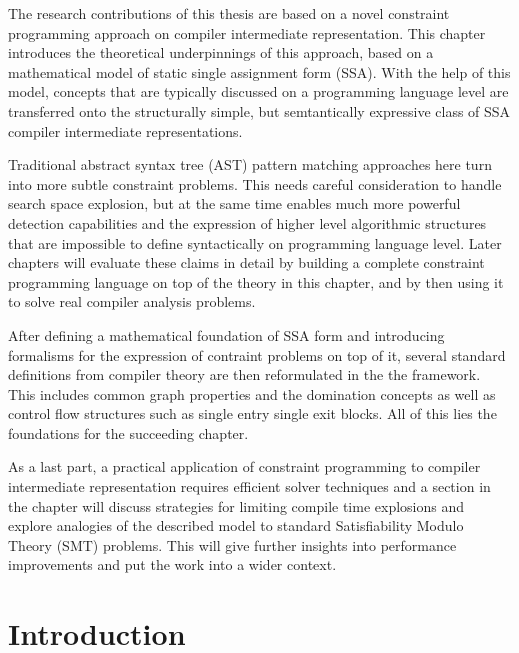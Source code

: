
    The research contributions of this thesis are based on a novel constraint
    programming approach on compiler intermediate representation.
    This chapter introduces the theoretical underpinnings of this approach,
    based on a mathematical model of static single assignment form (SSA).
    With the help of this model, concepts that are typically discussed on a
    programming language level are transferred onto the structurally simple,
    but semtantically expressive class of SSA compiler intermediate
    representations.

    Traditional abstract syntax tree (AST) pattern matching approaches here turn
    into more subtle constraint problems.
    This needs careful consideration to handle search space explosion, but at
    the same time enables much more powerful detection capabilities and the
    expression of higher level algorithmic structures that are impossible to
    define syntactically on programming language level.
    Later chapters will evaluate these claims in detail by building a complete
    constraint programming language on top of the theory in this chapter, and
    by then using it to solve real compiler analysis problems.

    After defining a mathematical foundation of SSA form and introducing
    formalisms for the expression of contraint problems on top of it, several
    standard definitions from compiler theory are then reformulated in the the
    framework.
    This includes common graph properties and the domination concepts as well
    as control flow structures such as single entry single exit blocks.
    All of this lies the foundations for the succeeding chapter.

    As a last part, a practical application of constraint programming to compiler
    intermediate representation requires efficient solver techniques and a
    section in the chapter will discuss strategies for limiting compile time
    explosions and explore analogies of the described model to standard
    Satisfiability Modulo Theory (SMT) problems.
    This will give further insights into performance improvements and put the
    work into a wider context.

\section{Introduction}

